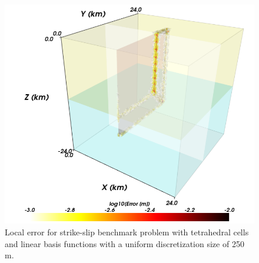 \noindent \begin{center}
\begin{figure}[H]
\begin{centering}
\includegraphics[scale=0.33]{benchmarks/strikeslip/figs/error_tet4_0250m}
\par\end{centering}

\caption{Local error for strike-slip benchmark problem with tetrahedral cells
and linear basis functions with a uniform discretization size of 250
m.\label{fig:benchmark:strikeslip:tet4:250m}}
\end{figure}

\par\end{center}


